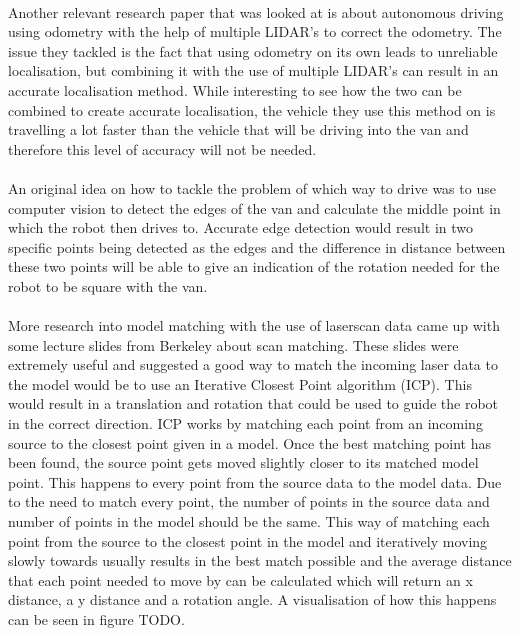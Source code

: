 \paragraph{}
Another relevant research paper that was looked at is about autonomous driving using odometry with the help of multiple LIDAR's to correct the odometry\cite{Akai}. The issue they tackled is the fact that using odometry on its own leads to unreliable localisation, but combining it with the use of multiple LIDAR's can result in an accurate localisation method. While interesting to see how the two can be combined to create accurate localisation, the vehicle they use this method on is travelling a lot faster than the vehicle that will be driving into the van and therefore this level of accuracy will not be needed.
\paragraph{}
An original idea on how to tackle the problem of which way to drive was to use computer vision to detect the edges of the van and calculate the middle point in which the robot then drives to. Accurate edge detection would result in two specific points being detected as the edges and the difference in distance between these two points will be able to give an indication of the rotation needed for the robot to be square with the van.
\paragraph{}
More research into model matching with the use of laserscan data came up with some lecture slides from Berkeley about scan matching\cite{Abbeel}. These slides were extremely useful and suggested a good way to match the incoming laser data to the model would be to use an Iterative Closest Point algorithm (ICP). This would result in a translation and rotation that could be used to guide the robot in the correct direction. ICP works by matching each point from an incoming source to the closest point given in a model. Once the best matching point has been found, the source point gets moved slightly closer to its matched model point. This happens to every point from the source data to the model data. Due to the need to match every point, the number of points in the source data and number of points in the model should be the same. This way of matching each point from the source to the closest point in the model and iteratively moving slowly towards usually results in the best match possible and the average distance that each point needed to move by can be calculated which will return an x distance, a y distance and a rotation angle. A visualisation of how this happens can be seen in figure TODO.
